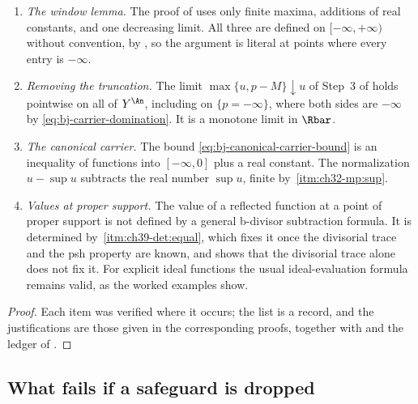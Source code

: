 \begin{proposition}
\begin{enumerate}
 domination forces $u(t^{-1}v)=-\infty$ and both sides are $-\infty$; no
 indeterminate difference arises.  The inequality
 \eqref{eq:bj-carrier-domination} is never rewritten as $u-p\le C$.
\item\label{itm:ch39-safe:window}
 \emph{The window lemma.}  The proof of
  uses only finite maxima, additions of
 real constants, and one decreasing limit.  All three are defined on
 $[-\infty,+\infty)$ without convention, by
 , so the argument is literal at points where
 every entry is $-\infty$.
\item\label{itm:ch39-safe:truncation}
 \emph{Removing the truncation.}  The limit
 $\max\{u,p-M\}\downarrow u$ of Step~3 of
  holds pointwise on all of $Y^{\An}$,
 including on $\{p=-\infty\}$, where both sides are $-\infty$ by
 \eqref{eq:bj-carrier-domination}.  It is a monotone limit in $\Rbar$.
\item\label{itm:ch39-safe:canonical}
 \emph{The canonical carrier.}  The bound
 \eqref{eq:bj-canonical-carrier-bound} is an inequality of functions into
 $[-\infty,0]$ plus a real constant.  The normalization $u-\sup u$
 subtracts the real number $\sup u$, finite by
 \,\cref{itm:ch32-mp:sup}.
\item\label{itm:ch39-safe:value}
 \emph{Values at proper support.}  The value of a reflected function at a
 point of proper support is not defined by a general b-divisor
 subtraction formula.  It is determined by \,\cref{itm:ch39-det:equal}, which
 fixes it once the divisorial trace and the psh property are known, and
  shows that the divisorial trace alone
 does not fix it.  For explicit ideal functions the usual ideal-evaluation
 formula remains valid, as the worked examples show.
\end{enumerate}
\end{proposition}

\begin{proof}
Each item was verified where it occurs; the list is a record, and the
justifications are those given in the corresponding proofs, together with
 and the ledger of
.
\end{proof}

\subsection{What fails if a safeguard is dropped}
\label{sec:ch39-safeguard-failures}

